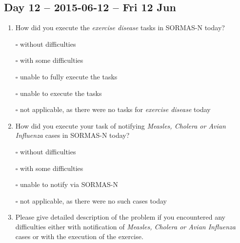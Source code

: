 \documentclass[a4paper, titlepage]{tufte-handout}
\begin{document}
\subsection{Day 12 -- 2015-06-12 -- Fri 12 Jun}
\label{sec-8-10}
\begin{enumerate}
\item How did you execute the \emph{exercise disease} tasks in SORMAS-N today?

\quad $\square$ without difficulties

\quad $\square$ with some difficulties

\quad $\square$ unable to fully execute the tasks

\quad $\square$ unable to execute the tasks

\quad $\square$ not applicable, as there were no tasks for \emph{exercise disease} today

\item How did you execute your task of notifying \emph{Measles, Cholera or Avian Influenza} cases in SORMAS-N today?

\quad $\square$ without difficulties

\quad $\square$ with some difficulties

\quad $\square$ unable to notify via SORMAS-N

\quad $\square$ not applicable, as there were no such cases today

\item Please give detailed description of the problem if you encountered any difficulties either with notification of \emph{Measles, Cholera or Avian Influenza} cases or with the execution of the exercise.

\hrulefill

\hrulefill

\hrulefill

\hrulefill

\hrulefill

\hrulefill

\hrulefill

\hrulefill

\hrulefill

\hrulefill
\end{enumerate}

\newpage
\end{document}
